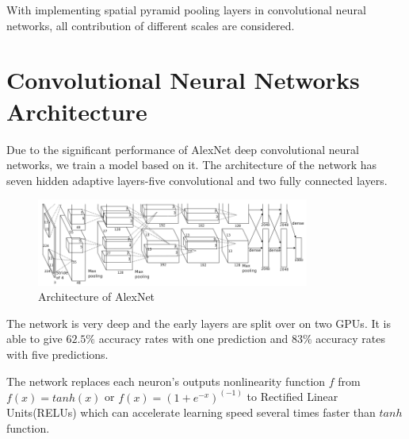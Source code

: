 With implementing spatial pyramid pooling layers in convolutional neural networks, all contribution of different scales are considered.

\section{Convolutional Neural Networks Architecture}

Due to the significant performance of AlexNet \citep{krizhevsky2012imagenet} deep convolutional neural networks, we train a model based on it. The architecture of the network has seven hidden adaptive layers-five convolutional and two fully connected layers.
\begin{figure}[!htb]
    \centering
	\includegraphics[width=0.8\textwidth]{AlexNet.png}
    \caption{Architecture of AlexNet}%
    \label{fig:ImageNetArch}%
\end{figure}
The network is very deep and the early layers are split over on two GPUs. It is able to give $62.5\%$ accuracy rates with one prediction and $83\%$ accuracy rates with five predictions.

The network replaces each neuron's outputs nonlinearity function $f$ from $f(x) = tanh(x)$ or $f(x) = (1 + e^{-x})^(-1)$ to Rectified Linear Units(RELUs)\citep{nair2010rectified} which can accelerate learning speed several times faster than $tanh$ function. 

